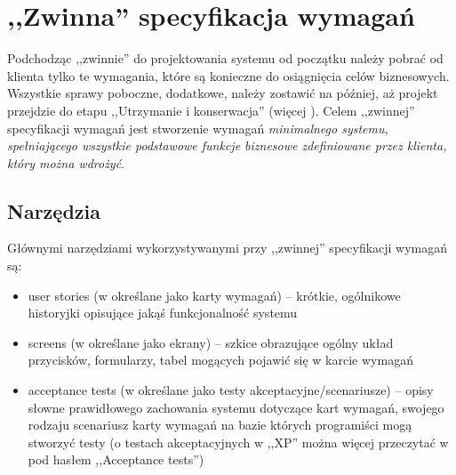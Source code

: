 \section{,,Zwinna'' specyfikacja wymagań}
\label{sec:zwinnaSpecyfikacjaWymagan}

Podchodząc ,,zwinnie'' do projektowania systemu od początku należy pobrać od klienta tylko te wymagania, które są konieczne do osiągnięcia celów biznesowych. Wszystkie sprawy poboczne, dodatkowe, należy zostawić na później, aż projekt przejdzie do etapu ,,Utrzymanie i konserwacja'' (więcej ). Celem ,,zwinnej'' specyfikacji wymagań jest stworzenie wymagań \emph{minimalnego systemu, spełniającego wszystkie podstawowe funkcje biznesowe zdefiniowane przez klienta, który można wdrożyć}.

\subsection{Narzędzia}
\label{sec:ZSWnarzedzia}

Głównymi narzędziami wykorzystywanymi przy ,,zwinnej'' specyfikacji wymagań są:
\begin{itemize}
    \item user stories (w \cite{Mad09} określane jako karty wymagań) -- krótkie, ogólnikowe historyjki opisujące jakąś funkcjonalność systemu
    \item screens (w \cite{Mad09} określane jako ekrany) -- szkice obrazujące ogólny układ przycisków, formularzy, tabel mogących pojawić się w karcie wymagań
    \item acceptance tests (w \cite{Mad09} określane jako testy akceptacyjne/scenariusze) -- opisy słowne prawidłowego zachowania systemu dotyczące kart wymagań, swojego rodzaju scenariusz karty wymagań na bazie których programiści mogą stworzyć testy (o testach akceptacyjnych w ,,XP'' można więcej przeczytać w \cite{Jef00} pod hasłem ,,Acceptance tests'')  
\end{itemize}

